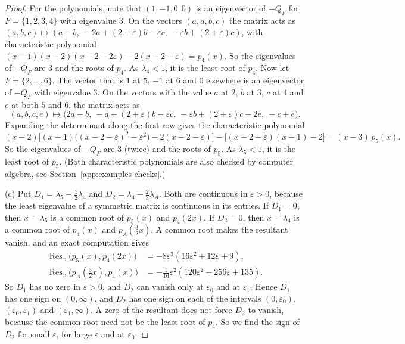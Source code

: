 \documentclass[EJP,preprint]{ejpecp}
\begin{document}
\begin{proof}
For the polynomials, note that $(1,-1,0,0)$ is an eigenvector of $-Q_F$ for
$F=\{1,2,3,4\}$ with eigenvalue $3$. On the vectors $(a,a,b,c)$ the matrix
acts as
$(a,b,c)\mapsto(a-b,\,-2a+(2+\varepsilon)b-\varepsilon c,\,-\varepsilon b+(2+\varepsilon)c)$,
with characteristic polynomial
$(x-1)(x-2)(x-2-2\varepsilon)-2(x-2-\varepsilon)=p_4(x)$. So the eigenvalues
of $-Q_F$ are $3$ and the roots of $p_4$. As $\lambda_4<1$, it is the least
root of $p_4$. Now let $F=\{2,\dots,6\}$. The vector that is $1$ at $5$, $-1$
at $6$ and $0$ elsewhere is an eigenvector of $-Q_F$ with eigenvalue $3$. On
the vectors with the value $a$ at $2$, $b$ at $3$, $c$ at $4$ and $e$ at both
$5$ and $6$, the matrix acts as
\[
 (a,b,c,e)\mapsto\bigl(2a-b,\ -a+(2+\varepsilon)b-\varepsilon c,\
 -\varepsilon b+(2+\varepsilon)c-2e,\ -c+e\bigr).
\]
Expanding the determinant along the first row
gives the characteristic polynomial
\[
 (x-2)\bigl[(x-1)\bigl((x-2-\varepsilon)^2-\varepsilon^2\bigr)-2(x-2-\varepsilon)\bigr]
 -\bigl[(x-2-\varepsilon)(x-1)-2\bigr]=(x-3)\,p_5(x).
\]
So the eigenvalues of $-Q_F$ are $3$ (twice) and the roots of $p_5$. As
$\lambda_5<1$, it is the least root of $p_5$. (Both characteristic polynomials are
also checked by computer algebra, see Section~\ref{app:examples-checks}.)

(c) Put $D_1=\lambda_5-\frac12\lambda_4$ and
$D_2=\lambda_4-\frac23\lambda_A$. Both are continuous in $\varepsilon>0$,
because the least eigenvalue of a symmetric matrix is continuous in its
entries. If $D_1=0$, then $x=\lambda_5$ is a common root of $p_5(x)$ and
$p_4(2x)$. If $D_2=0$, then $x=\lambda_4$ is a common root of $p_4(x)$ and
$p_A(\frac32x)$. A common root makes the resultant vanish, and an exact
computation gives
\begin{align*}
 \operatorname{Res}_x\bigl(p_5(x),p_4(2x)\bigr)
 &=-8\varepsilon^3(16\varepsilon^2+12\varepsilon+9),\\
 \operatorname{Res}_x\bigl(p_A(\tfrac32x),p_4(x)\bigr)
 &=-\tfrac1{16}\varepsilon^2(120\varepsilon^2-256\varepsilon+135).
\end{align*}
So $D_1$ has no zero in $\varepsilon>0$, and $D_2$ can vanish only at
$\varepsilon_0$ and at $\varepsilon_1$. Hence $D_1$ has one sign on
$(0,\infty)$, and $D_2$ has one sign on each of the intervals
$(0,\varepsilon_0)$, $(\varepsilon_0,\varepsilon_1)$ and
$(\varepsilon_1,\infty)$. A zero of the resultant does not force $D_2$ to
vanish, because the common root need not be the least root of $p_4$. So we find
the sign of $D_2$ for small $\varepsilon$, for large $\varepsilon$ and at
$\varepsilon_0$.


\end{proof}
\end{document}
